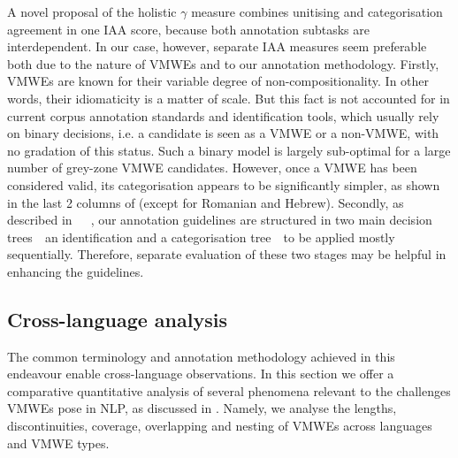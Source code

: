 \documentclass[output=paper,modfonts]{langscibook}
\begin{document}
A novel proposal of the holistic $\gamma$ measure \citep{DBLP:journals/coling/MathetWM15}  combines unitising and categorisation agreement in one IAA score, because both annotation subtasks are interdependent. In our case, however, separate IAA measures seem preferable both due to the nature of VMWEs and to our annotation methodology. Firstly, VMWEs are known for their variable degree of non-compositionality. In other words, their idiomaticity is a matter of scale. But this fact is not accounted for in current corpus annotation standards and identification tools, which usually rely on binary decisions, i.e. a candidate is seen as a VMWE or a non-VMWE, with no gradation of this status. Such a binary model is largely sub-optimal for a large number of grey-zone VMWE candidates. 
However, once a VMWE has been considered valid,  its categorisation appears to be significantly simpler, as shown in the last 2 columns of  (except for Romanian and Hebrew). Secondly, as described in~~\textendash~, our annotation guidelines are structured in two main decision trees~\textendash~an identification and a categorisation tree~\textendash~to be applied mostly sequentially. %
Therefore, separate evaluation of these two stages may be helpful in enhancing the guidelines.


\subsection{Cross-language analysis}
\label{sec:analysis}
%

The common terminology and annotation methodology achieved in this endeavour enable cross-language observations. In this section we offer a comparative quantitative analysis of several phenomena relevant to the challenges   VMWEs pose in NLP, as discussed in . Namely, we analyse the lengths, discontinuities, coverage, overlapping and nesting of VMWEs across languages and VMWE types.
\end{document}
